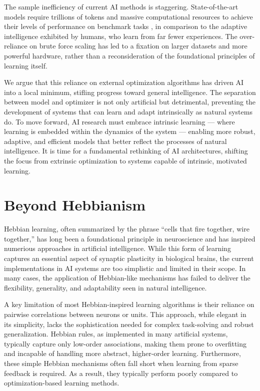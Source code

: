 \documentclass{article}
\begin{document}
The sample inefficiency of current AI methods is
staggering. State-of-the-art models require trillions of tokens and
massive computational resources to achieve their levels of performance on
benchmark tasks \cite{openai2024gpt4technicalreport},
in comparison to the adaptive intelligence exhibited by humans,
who learn from far fewer experiences. The over-reliance on brute force scaling has
led to a fixation on larger datasets and more powerful hardware, rather
than a reconsideration of the foundational principles of learning itself.

We argue that this reliance on external optimization algorithms has
driven AI into a local minimum, stifling progress toward general
intelligence. The separation between model and optimizer is not only
artificial but detrimental, preventing the development of systems that can
learn and adapt intrinsically as natural systems do. To move
forward, AI research must embrace intrinsic learning --- where learning
is embedded within the dynamics of the system --- enabling more robust,
adaptive, and efficient models that better reflect the processes of
natural intelligence. It is time for a fundamental rethinking
of AI architectures, shifting the focus from extrinsic optimization to
systems capable of intrinsic, motivated learning.


\section{Beyond Hebbianism}

Hebbian learning, often summarized by the phrase ``cells that fire
together, wire together,'' has long been a foundational principle
in neuroscience and has inspired numerious approaches in artificial
intelligence. While this form of learning captures an essential aspect of
synaptic plasticity in biological brains, the current implementations in
AI systems are too simplistic and limited in their scope. In many cases,
the application of Hebbian-like mechanisms has failed to deliver the
flexibility, generality, and adaptability seen in natural intelligence.

A key limitation of most Hebbian-inspired learning algorithms is
their reliance on pairwise correlations between neurons or
units. This approach, while elegant in its simplicity,
lacks the sophistication needed for complex task-solving and robust
generalization. Hebbian rules, as implemented in many artificial systems,
typically capture only low-order associations, making them prone
to overfitting and incapable of handling more abstract, higher-order
learning. Furthermore, these simple Hebbian mechanisms often fall
short when learning from sparse feedback is required.
As a result, they typically perform poorly compared to
optimization-based learning methods.
\end{document}
